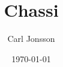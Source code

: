 


\title{Chassi}

\author{Carl Jonsson}

\date{\today}


\maketitle

\thispagestyle{empty}

\newpage

\renewcommand{\abstractname}{Abstract}
\begin{abstract}

\thispagestyle{empty}
\mbox{}

\end{abstract}

\newpage
\thispagestyle{empty}


\tableofcontents
\clearpage







\newpage


\newpage



\newpage



\newpage



\newpage


\newpage


\newpage




